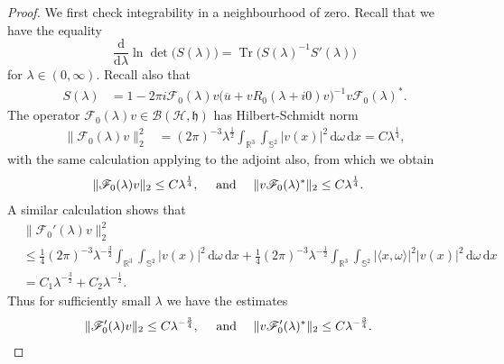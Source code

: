 \documentclass{article}
\def\B{\mathscr B}
\def\d{\mathrm{d}}
\def\F{\mathscr F}
\def\H{\mathcal H}
\def\R{\mathbb R}
\def\S{\mathbb S}
\def\HS{\mathfrak h}
\def\Tr{\mathop{\mathrm{Tr}}\nolimits}
\begin{document}
\begin{proof}
We first check integrability in a neighbourhood of zero. Recall that we have the equality 
$$
\frac{\d}{\d \lambda} \ln \det\big(S(\lambda)\big) = \Tr\big(S(\lambda)^{-1} S'(\lambda)\big)
$$ 
for $\lambda \in (0,\infty)$. 
Recall also that
\begin{align*}
S(\lambda) &= 1-2\pi i \F_0(\lambda) v \big(\overline{u} +v R_0(\lambda+i0)v\big)^{-1}v \F_0(\lambda)^*.
\end{align*}
The operator $\F_0(\lambda)v\in \B(\H,\HS)$ has Hilbert-Schmidt norm
\begin{align*}
\|\F_0(\lambda) v \|_2^2 &= (2\pi)^{-3} \lambda^{\frac12} \int_{\R^3} \int_{\S^2} |v(x)|^2 \, \d \omega \, \d x = C \lambda^{\frac{1}{4}},
\end{align*}
with the same calculation applying to the adjoint also, from which we obtain
\begin{align*}
\|\F_0(\lambda)v \|_2 &\leq C \lambda^{\frac{1}{4}}, \quad \hbox{ and } \quad \|v\F_0(\lambda)^*\|_2 \leq C \lambda^{\frac{1}{4}}.
\end{align*}
A similar calculation shows that
\begin{align*}
& \|\F_0'(\lambda) v \|_2^2 \\
&\leq \frac{1}{4} (2\pi)^{-3} \lambda^{-\frac{3}{2}} \int_{\R^3} \int_{\S^2} |v(x)|^2 \, \d \omega \, \d x + \frac{1}{4} (2\pi)^{-3} \lambda^{-\frac12} \int_{\R^3} \int_{\S^2} |\langle x, \omega \rangle|^2 |v(x)|^2 \, \d \omega \, \d x  \\
&= C_1 \lambda^{-\frac{3}{2}} + C_2 \lambda^{-\frac12}.
\end{align*}
Thus for sufficiently small $\lambda$ we have the estimates
\begin{align*}
\|\F_0'(\lambda)v \|_2 &\leq C \lambda^{-\frac{3}{4}}, \quad \hbox{ and } \quad \|v\F_0'(\lambda)^*\|_2 \leq C \lambda^{-\frac{3}{4}}.
\end{align*}


\end{proof}
\end{document}
